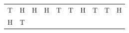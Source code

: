 {\begin{center}
\begin{xtabular*}{\mytablewidth}[t]{|p{10\mystarwidth}|p{10\mystarwidth}|p{10\mystarwidth}|p{10\mystarwidth}|p{10\mystarwidth}|p{10\mystarwidth}|p{10\mystarwidth}|p{10\mystarwidth}|p{10\mystarwidth}|p{10\mystarwidth}|}
        T &
        H &
        H &
        H &
        T &
        T &
        H &
        T &
        T &
        H%
     \tabularnewline{}
        H &
        T &

\end{xtabular*}
\end{center}}

